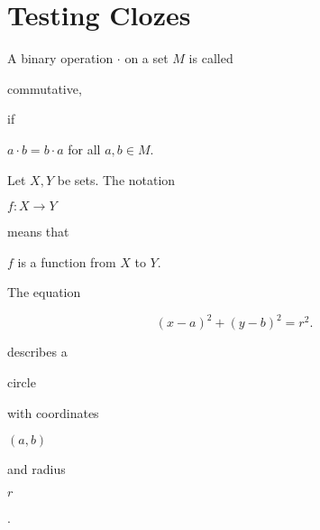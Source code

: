 \documentclass[12pt]{article}
\begin{document}
\section{Testing Clozes}

\begin{note}
    \newline
    \begin{clozefield}
        A binary operation $ · $ on a set $ M $ is called 
        \begin{cloze}
            commutative,
        \end{cloze}
        if 
        \begin{cloze} $ a · b = b ·a  $ for all $ a,b ∈ M $. \end{cloze}
    \end{clozefield} 
    \begin{field} \end{field}
\end{note}

\begin{note}
    \begin{clozefield}
        Let $ X,Y $ be sets. The notation \begin{cloze} $ f\colon X → Y $ \end{cloze}
        means that \begin{cloze} $ f $ is a function from $ X $ to $ Y $. \end{cloze}
    \end{clozefield}
\end{note}

\begin{note}
    \begin{clozefield}
        The equation 
        \begin{cloze}
            \begin{equation*}
                { (x-a)^{2}+(y-b)^{2}=r^{2}.}
            \end{equation*}
        \end{cloze}
        describes a \begin{cloze} circle \end{cloze}
        with coordinates \begin{cloze}  $(a,b)$ \end{cloze} 
        and radius \begin{cloze} $ r $ \end{cloze}.
    \end{clozefield}
\end{note}
\end{document}
